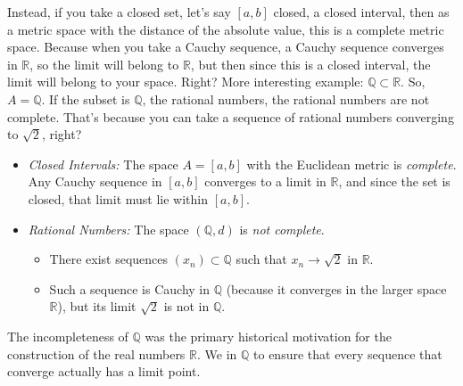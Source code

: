
\begin{spoken-clean}[00:06:15 - 00:07:34]
Instead, if you take a closed set, let's say $[a, b]$ closed, a closed interval, then as a metric space with the distance of the absolute value, this is a complete metric space. Because when you take a Cauchy sequence, a Cauchy sequence converges in $\mathbb{R}$, so the limit will belong to $\mathbb{R}$, but then since this is a closed interval, the limit will belong to your space. Right? More interesting example: $\mathbb{Q} \subset \mathbb{R}$. So, $A = \mathbb{Q}$. If the subset is $\mathbb{Q}$, the rational numbers, the rational numbers are not complete. That's because you can take a sequence of rational numbers converging to $\sqrt{2}$, right?
\end{spoken-clean}

\begin{math-stroke}
\begin{itemize}
    \setcounter{enumi}{0} \item \emph{Closed Intervals:} The space $A = [a, b]$ with the Euclidean metric is \emph{complete}. Any Cauchy sequence in $[a, b]$ converges to a limit in $\mathbb{R}$, and since the set is closed, that limit must lie within $[a, b]$.
    \setcounter{enumi}{1} \item \emph{Rational Numbers:} The space $(\mathbb{Q}, d)$ is \emph{not complete}.
    \begin{itemize}
        \item There exist sequences $(x_n) \subset \mathbb{Q}$ such that $x_n \to \sqrt{2}$ in $\mathbb{R}$.
        \item Such a sequence is Cauchy in $\mathbb{Q}$ (because it converges in the larger space $\mathbb{R}$), but its limit $\sqrt{2}$ is not in $\mathbb{Q}$.
    \end{itemize}
\end{itemize}

\begin{explanation-of-steps}
The incompleteness of $\mathbb{Q}$ was the primary historical motivation for the construction of the real numbers $\mathbb{R}$. We  in $\mathbb{Q}$ to ensure that every sequence that  converge actually has a limit point.
\end{explanation-of-steps}
\end{math-stroke}

